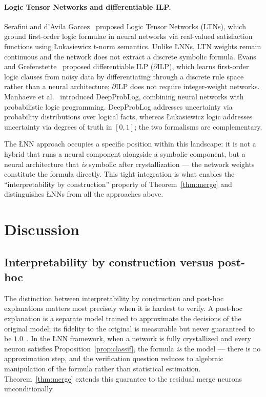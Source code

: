 \documentclass[12pt,a4paper]{article}
\newcommand{\LNN}{\L{}NN}
\begin{document}
\paragraph{Logic Tensor Networks and differentiable ILP.}
Serafini and d'Avila Garcez~\cite{serafini2016} proposed Logic Tensor
Networks (LTNs), which ground first-order logic formulae in neural networks
via real-valued satisfaction functions using \L{}ukasiewicz t-norm semantics.
Unlike \LNN{}s, LTN weights remain continuous and the network does not
extract a discrete symbolic formula.
Evans and Grefenstette~\cite{evans2018} proposed differentiable
ILP ($\partial$ILP), which learns first-order logic clauses from noisy data
by differentiating through a discrete rule space rather than a neural
architecture; $\partial$ILP does not require integer-weight networks.
Manhaeve et al.~\cite{manhaeve2018} introduced DeepProbLog, combining neural
networks with probabilistic logic programming.
DeepProbLog addresses uncertainty via probability distributions over logical
facts, whereas \L{}ukasiewicz logic addresses uncertainty via degrees of truth
in $[0,1]$; the two formalisms are complementary.

The \LNN{} approach occupies a specific position within this landscape: it is
not a hybrid that runs a neural component alongside a symbolic component, but
a neural architecture that \emph{is} symbolic after crystallization --- the
network weights constitute the formula directly.
This tight integration is what enables the ``interpretability by construction''
property of Theorem~\ref{thm:merge} and distinguishes \LNN{}s from all the
approaches above.

\section{Discussion}
\label{sec:discussion}

\subsection{Interpretability by construction versus post-hoc}

The distinction between interpretability by construction and post-hoc
explanations matters most precisely when it is hardest to verify.
A post-hoc explanation is a separate model trained to approximate the
decisions of the original model; its fidelity to the original is measurable
but never guaranteed to be $1.0$~\cite{guidotti2018}.
In the \LNN{} framework, when a network is fully crystallized and every neuron
satisfies Proposition~\ref{prop:classif}, the formula \emph{is} the model ---
there is no approximation step, and the verification question reduces to
algebraic manipulation of the formula rather than statistical estimation.
Theorem~\ref{thm:merge} extends this guarantee to the residual merge neurons
unconditionally.
\end{document}
